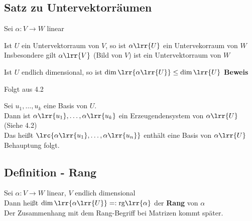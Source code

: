 \subsection{Satz zu Untervektorräumen}
	Sei $\alpha:V\rightarrow W$ linear
		\item Ist $U$ ein Untervektorraum von $V$, so ist $\alpha\lrr{U}$ ein Untervekorraum von $W$\\
			Insbesondere gilt $\alpha\lrr{V}$ (Bild von $V$) ist ein Untervektorraum von $W$
		\item Ist $U$ endlich dimensional, so ist $\dim\lrr{\alpha\lrr{U}}\leq\dim\lrr{U}$
	\subExEnd
	\textbf{Beweis}
		\item Folgt aus 4.2
		\item Sei $u_1,\dots,u_k$ eine Basis von $U$.\\
			Dann ist $\alpha\lrr{u_1},\dots,\alpha\lrr{u_k}$ ein Erzeugendensystem von $\alpha\lrr{U}$ (Siehe 4.2)\\
			Das heißt $\lrc{\alpha\lrr{u_1},\dots,\alpha\lrr{u_n}}$ enthält eine Basis von $\alpha\lrr{U}$ Behauptung folgt.
	\subExEnd

\subsection{Definition - Rang}
	Sei $\alpha:V\rightarrow W$ linear, $V$ endlich dimensional\\
	Dann heißt $\dim\lrr{\alpha\lrr{U}}=:\mbox{rg}\lrr{\alpha}$ der \textbf{Rang} von $\alpha$\\
	Der Zusammenhang mit dem Rang-Begriff bei Matrizen kommt später.

